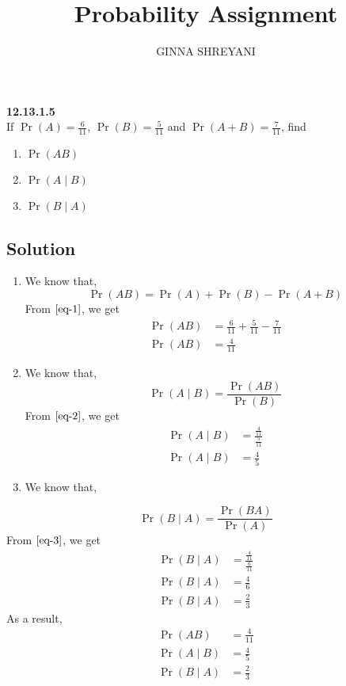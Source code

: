 \documentclass[10pt,twocolumn]{article}
\title{
Probability Assignment
}
\author{GINNA SHREYANI}
\date{}
\begin{document}
\maketitle


\textbf{12.13.1.5}\\
If $\Pr(A)=\frac{6}{11}$, $\Pr(B)=\frac{5}{11}$ and $\Pr(A+B)=\frac{7}{11}$, find\\
\begin{enumerate}
	\item $\Pr(AB)$   
	\item $\Pr(A \mid B)$  
	\item $\Pr(B\mid A)$
\end{enumerate}
\subsection*{Solution}
\begin{enumerate}
	\item We know that,
\begin{equation}
	\Pr(AB) = \Pr(A) + \Pr(B) -\Pr(A+B)
	\label{eq-1}
\end{equation}
From $\eqref{eq-1}$, we get\\
\begin{align}
	\Pr(AB) &= \frac{6}{11} + \frac{5}{11} - \frac{7}{11}\\
	\Pr(AB) &= \frac{4}{11}
\end{align}
	\item We know that,
\begin{equation}
	\Pr(A\mid B) = \frac{\Pr(AB)}{\Pr(B)}
	\label{eq-2}
\end{equation}
From $\eqref{eq-2}$, we get\\
\begin{align}
	\Pr(A \mid B) &= \frac{\frac{4}{11}}{\frac{5}{11}}\\
	\Pr(A\mid B) &= \frac{4}{5}
\end{align}
	\item We know that,
\end{enumerate}
\begin{equation}
	\Pr(B\mid A)=\frac{\Pr(BA)}{\Pr(A)}
	\label{eq-3}
\end{equation}
From $\eqref{eq-3}$, we get\\
\begin{align}
	\Pr(B\mid A) &= \frac{\frac{4}{11}}{\frac{6}{11}}\\
	\Pr(B\mid A) &= \frac{4}{6}\\
	\Pr(B\mid A) &= \frac{2}{3}
\end{align}
As a result,
\begin{align}
	\Pr(AB) &= \frac{4}{11}\\
	\Pr(A\mid B) &= \frac{4}{5}\\
	\Pr(B\mid A) &= \frac{2}{3}
\end{align}
\end{document}
